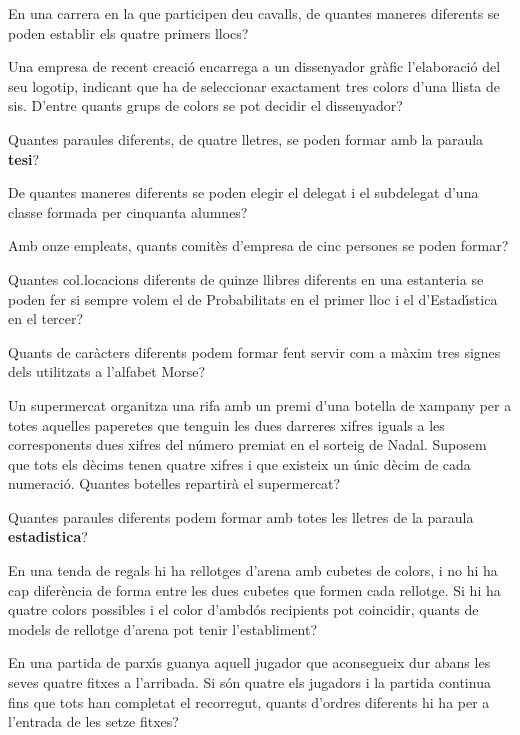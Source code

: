 \documentclass[12pt]{article}
\begin{document}
\probl  En una carrera en la que participen deu cavalls, de
quantes maneres diferents se poden establir els quatre primers
llocs? 

\probl  Una empresa de recent creaci\'{o} encarrega a un dissenyador
gr\`{a}fic l'elaboraci\'{o} del seu logotip, indicant que ha de
seleccionar exactament tres colors d'una llista de sis. D'entre
quants grups de colors se pot decidir el dissenyador? 

\probl  Quantes paraules diferents, de quatre lletres, se poden
formar amb la paraula {\bf tesi}? 

\probl  De quantes maneres diferents se poden elegir el delegat i
el subdelegat d'una classe formada per cinquanta alumnes? 

\probl  Amb onze empleats, quants comit\`{e}s d'empresa de cinc
persones se poden formar? 

\probl  Quantes col.locacions diferents de quinze llibres
diferents en una estanteria se poden fer si sempre volem el de
Probabilitats en el primer lloc i el d'Estad\'{\i}stica en el tercer?

\probl  Quants de car\`{a}cters diferents podem formar fent servir com
a m\`{a}xim tres signes dels utilitzats a l'alfabet Morse? 

\probl  Un supermercat organitza una rifa amb un premi d'una
botella de xampany per a totes aquelles paperetes que tenguin les
dues darreres xifres iguals a les corresponents dues xifres del
n\'{u}mero premiat en el sorteig de Nadal. Suposem que tots els d\`{e}cims
tenen quatre xifres i que existeix un \'{u}nic d\`{e}cim de cada
numeraci\'{o}. Quantes botelles repartir\`{a} el supermercat? 

\probl  Quantes paraules diferents podem formar amb totes les
lletres de la paraula {\bf estadistica}? 

\probl  En una tenda de regals hi ha rellotges d'arena amb cubetes
de colors, i no hi ha cap difer\`{e}ncia de forma entre les dues
cubetes que formen cada rellotge. Si hi ha quatre colors possibles
i el color d'ambd\'{o}s recipients pot coincidir, quants de models de
rellotge d'arena pot tenir l'establiment? 

\probl  En una partida de parx\'{\i}s guanya aquell jugador que
aconsegueix dur abans les seves quatre fitxes a l'arribada. Si s\'{o}n
quatre els jugadors i la partida continua fins que tots han
completat el recorregut, quants d'ordres diferents hi ha per a
l'entrada de les setze fitxes? 
\end{document}
